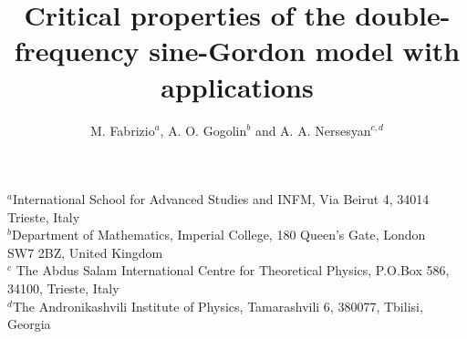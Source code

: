 





\setlength {\textwidth}{14.5cm}
\setlength {\textheight}{23cm}
\setlength {\oddsidemargin}{11mm}
\setlength {\topmargin}{-15mm}   
\setlength {\headheight}{8mm}
\setlength {\headsep}{10mm}
\newcommand{\be}{\begin{equation}}
\newcommand{\ee}{\end{equation}}
\newcommand{\bea}{\begin{eqnarray}}
\newcommand{\eea}{\end{eqnarray}}
\newcommand{\bn}{\begin{eqnarray*}}
\newcommand{\en}{\end{eqnarray*}}
\newcommand{\pdag}{{\phantom{\dagger}}}
\newcommand{\rD}{\mbox{D}}
\newcommand{\reff}{\mbox{eff}}
\newcommand{\rR}{\mbox{R}}
\newcommand{\rL}{\mbox{L}}
\newcommand{\p}{\partial}
\newcommand{\s}{\sigma}
\newcommand{\rF}{\mbox{F}}
\newcommand{\rf}{\mbox{f}}
\newcommand{\up}{\uparrow}
\newcommand{\down}{\downarrow}
\newcommand{\la}{\langle}
\newcommand{\ra}{\rangle}
\newcommand{\rd}{\mbox{d}}
\newcommand{\ri}{\mbox{i}}
\newcommand{\re}{\mbox{e}}
\newcommand{\sumnn}{\sum_{\langle jk \rangle}}
\newcommand{\rk}{\mbox{k}}
\newcommand{\htau}{\hat{\tau}}
\newcommand{\var}{\varepsilon}
\renewcommand{\baselinestretch}{1.26}
%
%

\title{Critical properties of the double-frequency sine-Gordon model 
with applications}
\author{M. Fabrizio$^a$, A. O. Gogolin$^b$ and A. A. Nersesyan$^{c,d}$}
\vspace{2cm}
\maketitle

\begin{center}
$^a$International School for Advanced Studies and INFM, 
Via Beirut 4, 34014 Trieste, Italy\\ 
$^b$Department of Mathematics, Imperial College, 180 Queen's Gate,
London\\ 
SW7 2BZ, United Kingdom\\
$^c$ The Abdus Salam International Centre for Theoretical Physics,
P.O.Box 586, 34100, Trieste, Italy\\
$^d$The Andronikashvili Institute of Physics, Tamarashvili 6, 380077, 
Tbilisi, Georgia
\end{center}

